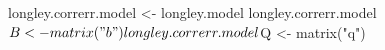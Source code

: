 \begin{Schunk}
\begin{Sinput}
 longley.correrr.model <- longley.model
 longley.correrr.model$B <- matrix("b")
 longley.correrr.model$Q <- matrix("q")
\end{Sinput}
\end{Schunk}
